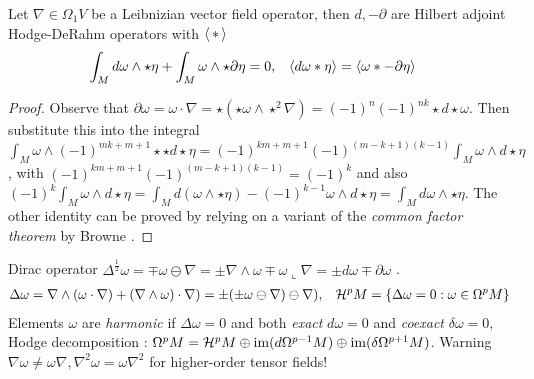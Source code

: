 \documentclass{juliacon}
\begin{document}
\begin{theorem}
	Let $ \nabla \in\Omega_1 V $ be a Leibnizian vector field operator, then $d,-\partial$ are Hilbert adjoint Hodge-DeRahm operators with $\left\langle \,\ast\, \right\rangle$
	\begin{align*}
		\int_M d\omega\wedge\star\eta +\int_M \omega\wedge\star\partial\eta &= 0, & \left\langle d\omega\ast\eta \right\rangle &=\left\langle \omega\ast-\partial\eta \right\rangle
	\end{align*}
\end{theorem}
\begin{proof}
	Observe that $\partial\omega = \omega\cdot\nabla = \star(\star\omega\wedge\star^2\nabla) = (-1)^n(-1)^{nk}\star d\star\omega$.
	Then  substitute this into the integral $\int_M \omega\wedge(-1)^{mk+m+1}\star\star d\star\eta = (-1)^{km+m+1}(-1)^{(m-k+1)(k-1)}\int_M\omega\wedge d\star\eta$,
	with $(-1)^{km+m+1}(-1)^{(m-k+1)(k-1)}=(-1)^k$ and also
	$ (-1)^k\int_M\omega\wedge d\star\eta = \int_M d(\omega\wedge\star\eta) - (-1)^{k-1}\omega\wedge d\star\eta = \int_M d\omega\wedge\star\eta$.
	The other identity can be proved by relying on a variant of the \textit{common factor theorem} by Browne \cite{browne}.
\end{proof}
\begin{theorem}
	Dirac operator $ \Delta^\frac12\omega = \mp\omega\ominus\nabla = \pm\nabla\wedge\omega \mp \omega\llcorner\nabla  = \pm d\omega\mp\partial\omega$ \cite{garling}.
	\begin{align*}
		\Delta\omega &= \nabla\wedge(\omega\cdot\nabla) + (\nabla\wedge\omega)\cdot\nabla) = \pm(\pm\omega\ominus\nabla)\ominus\nabla), & \mathcal{H}^p M = \left\{ \Delta\omega = 0 : \omega\in \Omega^pM \right\}
	\end{align*}
	Elements $\omega$ are \textit{harmonic} if $\Delta\omega = 0$ and both \textit{exact} $d\omega=0$ and \textit{coexact} $\delta\omega=0$, Hodge decomposition \cite{ivancevic}:
	$\Omega^pM=\mathcal{H}^pM\oplus\text{im}(d\Omega^{p-1}M)\oplus\text{im}(\delta\Omega^{p+1}M)$.
	Warning $\nabla\omega\neq\omega\nabla, \nabla^2\omega=\omega\nabla^2$ for higher-order tensor fields!
\end{theorem}

\end{document}
